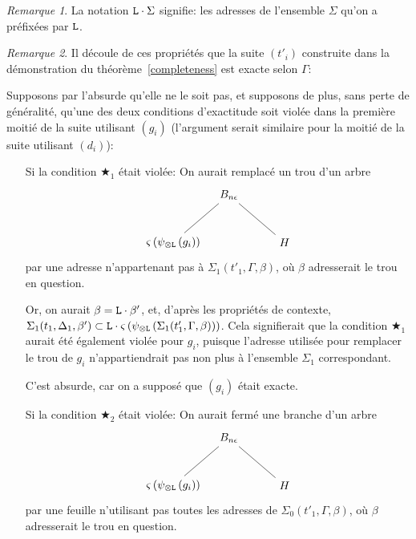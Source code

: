 \documentclass[11pt,a4paper]{article}
\theoremstyle{plain}
\theoremstyle{definition}
\theoremstyle{remark}
\newtheorem{remark}{Remarque}
\newcommand*{\tensor}{\otimes}
\newcommand*{\someperm}{\varsigma}
\newcommand*{\sequent}{\Gamma}
\newcommand*{\sequentbis}{\Delta}
\newcommand*{\Left}{\textnormal{\texttt{L}}}
\newcommand*{\unknown}{H}
\newcommand*{\lowapprox}{\ensuremath{\Sigma_0}}
\newcommand*{\highapprox}{\ensuremath{\Sigma_1}}
\newcommand*{\exactcond}{\bigstar_1}
\newcommand*{\exactcondbis}{\bigstar_2}
\begin{document}
\begin{remark}
    La notation $\Left \cdot \Sigma$ signifie: les adresses de l'ensemble $\Sigma$ qu'on a préfixées par $\Left$.
\end{remark}

\begin{remark}
    Il découle de ces propriétés que la suite $(t'_i)$ construite dans la démonstration du théorème~\ref{completeness} est exacte selon $\sequent$:

    Supposons par l'absurde qu'elle ne le soit pas, et supposons de plus, sans perte de généralité, qu'une des deux conditions d'exactitude soit violée dans la première moitié de la suite utilisant $(g_i)$ (l'argument serait similaire pour la moitié de la suite utilisant $(d_i)$):

    \begin{itemize}
        \item[Si la condition $\exactcond$ était violée:] On aurait remplacé un trou d'un arbre 
            \begin{equation*}
            \begin{tikzpicture}%
            [level distance=1.5cm,
            level 1/.style={sibling distance=3.5cm}]
            \node {$B_{n \epsilon}$}
                child {node {$\someperm \left( \psi_{\tensor\Left} \left(
                g_i\right) \right)$}}
                child {node {$\unknown$}
            };
            \end{tikzpicture}
            \end{equation*}
            par une adresse n'appartenant pas à $\highapprox(t'_1, \sequent, \beta)$, où $\beta$ adresserait le trou en question. 
            
            Or, on aurait $\beta = \Left \cdot \beta'$, et, d'après les propriétés de contexte, $\highapprox(t_1, \sequentbis_1, \beta') \subset \Left \cdot \someperm \left( \psi_{\tensor\Left} \left(\highapprox(t'_1, \sequent, \beta)\right) \right)$. Cela signifierait que la condition $\exactcond$ aurait été également violée pour $g_i$, puisque l'adresse utilisée pour remplacer le trou de $g_i$ n'appartiendrait pas non plus à l'ensemble $\highapprox$ correspondant. 
            
            C'est absurde, car on a supposé que $(g_i)$ était exacte.

        \item[Si la condition $\exactcondbis$ était violée:] On aurait fermé une branche d'un arbre 
            \begin{equation*}
            \begin{tikzpicture}%
            [level distance=1.5cm,
            level 1/.style={sibling distance=3.5cm}]
            \node {$B_{n \epsilon}$}
                child {node {$\someperm \left( \psi_{\tensor\Left} \left(
                g_i\right) \right)$}}
                child {node {$\unknown$}
            };
            \end{tikzpicture}
            \end{equation*}
            par une feuille n'utilisant pas toutes les adresses de $\lowapprox(t'_1, \sequent, \beta)$, où $\beta$ adresserait le trou en question. 
            

\end{itemize}
\end{remark}
\end{document}
